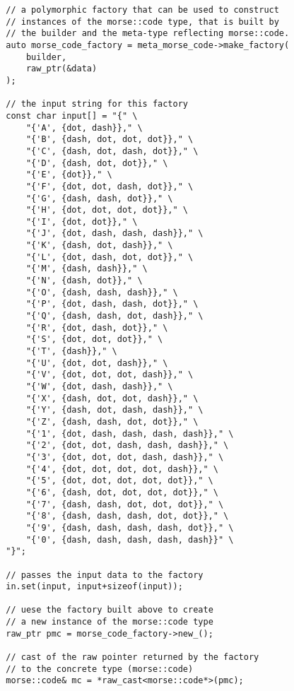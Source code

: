 \begin{lstlisting}
        // a polymorphic factory that can be used to construct
        // instances of the morse::code type, that is built by
        // the builder and the meta-type reflecting morse::code.
        auto morse_code_factory = meta_morse_code->make_factory(
            builder,
            raw_ptr(&data)
        );

        // the input string for this factory
        const char input[] = "{" \
            "{'A', {dot, dash}}," \
            "{'B', {dash, dot, dot, dot}}," \
            "{'C', {dash, dot, dash, dot}}," \
            "{'D', {dash, dot, dot}}," \
            "{'E', {dot}}," \
            "{'F', {dot, dot, dash, dot}}," \
            "{'G', {dash, dash, dot}}," \
            "{'H', {dot, dot, dot, dot}}," \
            "{'I', {dot, dot}}," \
            "{'J', {dot, dash, dash, dash}}," \
            "{'K', {dash, dot, dash}}," \
            "{'L', {dot, dash, dot, dot}}," \
            "{'M', {dash, dash}}," \
            "{'N', {dash, dot}}," \
            "{'O', {dash, dash, dash}}," \
            "{'P', {dot, dash, dash, dot}}," \
            "{'Q', {dash, dash, dot, dash}}," \
            "{'R', {dot, dash, dot}}," \
            "{'S', {dot, dot, dot}}," \
            "{'T', {dash}}," \
            "{'U', {dot, dot, dash}}," \
            "{'V', {dot, dot, dot, dash}}," \
            "{'W', {dot, dash, dash}}," \
            "{'X', {dash, dot, dot, dash}}," \
            "{'Y', {dash, dot, dash, dash}}," \
            "{'Z', {dash, dash, dot, dot}}," \
            "{'1', {dot, dash, dash, dash, dash}}," \
            "{'2', {dot, dot, dash, dash, dash}}," \
            "{'3', {dot, dot, dot, dash, dash}}," \
            "{'4', {dot, dot, dot, dot, dash}}," \
            "{'5', {dot, dot, dot, dot, dot}}," \
            "{'6', {dash, dot, dot, dot, dot}}," \
            "{'7', {dash, dash, dot, dot, dot}}," \
            "{'8', {dash, dash, dash, dot, dot}}," \
            "{'9', {dash, dash, dash, dash, dot}}," \
            "{'0', {dash, dash, dash, dash, dash}}" \
        "}";

        // passes the input data to the factory
        in.set(input, input+sizeof(input));

        // uese the factory built above to create
        // a new instance of the morse::code type
        raw_ptr pmc = morse_code_factory->new_();

        // cast of the raw pointer returned by the factory
        // to the concrete type (morse::code)
        morse::code& mc = *raw_cast<morse::code*>(pmc);


\end{lstlisting}
